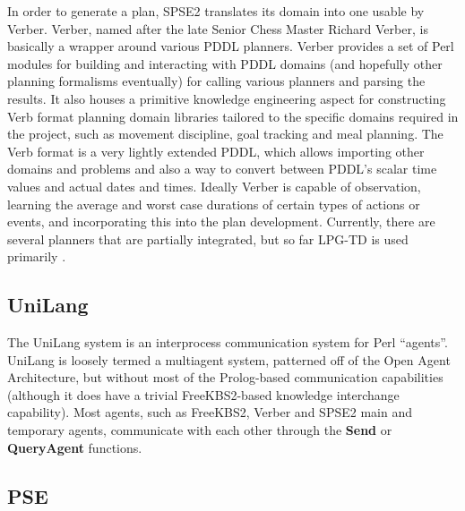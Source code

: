 \documentclass[letterpaper]{article}
\begin{document}
In order to generate a plan, SPSE2 translates its domain into one
usable by Verber.  Verber, named after the late Senior Chess Master
Richard Verber, is basically a wrapper around various PDDL planners.
Verber provides a set of Perl modules for building and interacting
with PDDL domains (and hopefully other planning formalisms eventually)
for calling various planners and parsing the results.  It also houses
a primitive knowledge engineering aspect for constructing Verb format
planning domain libraries tailored to the specific domains required in
the project, such as movement discipline, goal tracking and meal
planning.  The Verb format is a very lightly extended PDDL, which
allows importing other domains and problems and also a way to convert
between PDDL's scalar time values and actual dates and times.  Ideally
Verber is capable of observation, learning the average and worst case
durations of certain types of actions or events, and incorporating
this into the plan development.  Currently, there are several planners
that are partially integrated, but so far LPG-TD is used primarily
\cite{gerevini2004}.

\subsection{UniLang}

\noindent The UniLang system is an interprocess communication system
for Perl ``agents''.  UniLang is loosely termed a multiagent system,
patterned off of the Open Agent Architecture, but without most of the
Prolog-based communication capabilities (although it does have a
trivial FreeKBS2-based knowledge interchange capability).  Most
agents, such as FreeKBS2, Verber and SPSE2 main and temporary agents,
communicate with each other through the {\bf Send} or {\bf
  Query\-Agent} functions.

\subsection{PSE}
\end{document}
